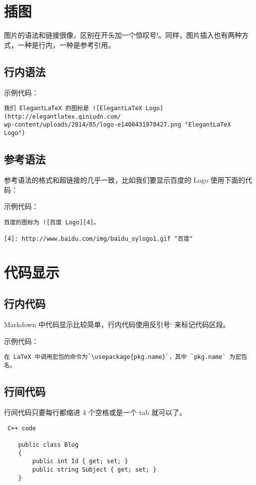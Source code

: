 \section{插图}
图片的语法和链接很像，区别在开头加一个惊叹号!。同样，图片插入也有两种方式，一种是行内，一种是参考引用。


\subsection{行内语法}
示例代码：
\begin{verbatim}
我们 ElegantLaTeX 的图标是 ![ElegantLaTeX Logo](http://elegantlatex.qiniudn.com/
wp-content/uploads/2014/05/logo-e1400431970427.png "ElegantLaTeX Logo")
\end{verbatim}


\subsection{参考语法}
参考语法的格式和超链接的几乎一致，比如我们要显示百度的 Logo 使用下面的代码：

示例代码：
\begin{verbatim}
百度的图标为 ![百度 Logo][4]。

[4]: http://www.baidu.com/img/baidu_sylogo1.gif "百度"
\end{verbatim}


\section{代码显示}
\subsection{行内代码}
Markdown 中代码显示比较简单，行内代码使用反引号` 来标记代码区段。

示例代码：
\begin{verbatim}
在 LaTeX 中调用宏包的命令为`\usepackage{pkg.name}`，其中 `pkg.name` 为宏包名。
\end{verbatim}


\subsection{行间代码}
行间代码只要每行都缩进 4 个空格或是一个 tab 就可以了。
\begin{verbatim}
 C++ code

    public class Blog
    {
        public int Id { get; set; }
        public string Subject { get; set; }
    }
\end{verbatim}


